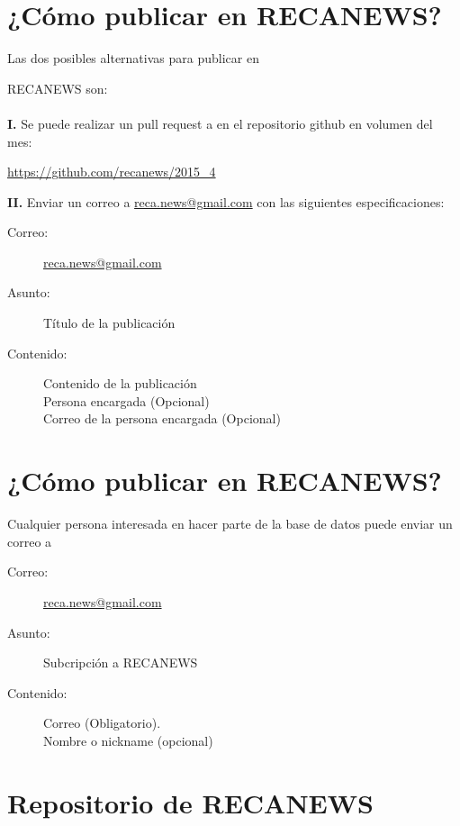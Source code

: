 \section*{¿Cómo publicar en RECANEWS?}
Las dos posibles alternativas para publicar en\par RECANEWS son:\\
\\
\textbf{I.} Se puede realizar un pull request a en el repositorio github en volumen del mes:
\begin{center}
 \url{https://github.com/recanews/2015_4}
\end{center}

\noindent \textbf{II.} Enviar un correo a \url{reca.news@gmail.com} con las siguientes especificaciones:
\begin{description}
\item[Correo:]\url{reca.news@gmail.com}
\item[Asunto:]Título de la publicación
\item[Contenido:]Contenido de la publicación\\
Persona encargada (Opcional)\\
Correo de la persona encargada (Opcional)
\end{description}
  

\section*{¿Cómo publicar en RECANEWS?}

Cualquier persona interesada en hacer parte de la base de datos puede enviar un correo a 
\begin{description}
\item[Correo:]\url{reca.news@gmail.com}
\item[Asunto:]Subcripción a RECANEWS
\item[Contenido:]Correo (Obligatorio).\\
Nombre o nickname (opcional)
\end{description}

\section*{Repositorio de RECANEWS}

